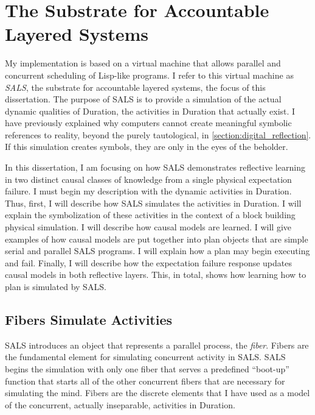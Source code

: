 \chapter{The Substrate for Accountable Layered Systems}
\label{chapter:the_substrate_for_accountable_layered_systems}


My implementation is based on a virtual machine that allows parallel
and concurrent scheduling of Lisp-like programs.  I refer to this
virtual machine as \emph{SALS}, the substrate for accountable layered
systems, the focus of this dissertation.  The purpose of SALS is to
provide a simulation of the actual dynamic qualities of Duration, the
activities in Duration that actually exist.  I have previously
explained why computers cannot create meaningful symbolic references
to reality, beyond the purely tautological, in
\autoref{section:digital_reflection}.  If this simulation creates
symbols, they are only in the eyes of the beholder.

In this dissertation, I am focusing on how SALS demonstrates
reflective learning in two distinct causal classes of knowledge from a
single physical expectation failure.  I must begin my description with
the dynamic activities in Duration.  Thus, first, I will describe how
SALS simulates the activities in Duration.  I will explain the
symbolization of these activities in the context of a block building
physical simulation.  I will describe how causal models are learned.
I will give examples of how causal models are put together into plan
objects that are simple serial and parallel SALS programs.  I will
explain how a plan may begin executing and fail.  Finally, I will
describe how the expectation failure response updates causal models in
both reflective layers.  This, in total, shows how learning how to
plan is simulated by SALS.

\section{Fibers Simulate Activities}

SALS introduces an object that represents a parallel process, the
\emph{fiber}.  Fibers are the fundamental element for simulating
concurrent activity in SALS.  SALS begins the simulation with only
one fiber that serves a predefined ``boot-up'' function that starts
all of the other concurrent fibers that are necessary for simulating
the mind.  Fibers are the discrete elements that I have used as a
model of the concurrent, actually inseparable, activities in Duration.

